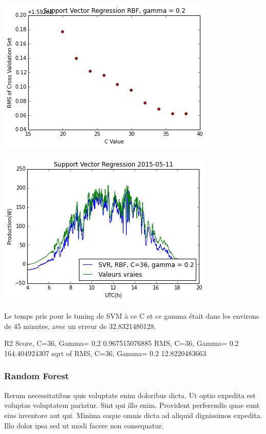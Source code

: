 \documentclass[a4paper]{article}
\begin{document}
\begin{multicols}{2}
\includegraphics[width=\textwidth/2]{./images/svmselectc.png}

\includegraphics[width=\textwidth/2]{./images/11maysvm.png}

Le temps pris pour le tuning de SVM à ce C et ce gamma était dans les environs de 45 minutes, avec un erreur de 32.8321480128. 

R2 Score, C=36, Gamma= 0.2
0.967515076885
RMS, C=36, Gamma= 0.2
164.404924307
sqrt of RMS, C=36, Gamma= 0.2
12.8220483663

\subsubsection{Random Forest}
Rerum necessitatibus quis voluptate enim doloribus dicta. Ut optio expedita est
    voluptas voluptatem pariatur. Sint qui illo enim. Provident perferendis quae
    sunt eius inventore aut qui. Minima eaque omnis dicta ad aliquid dignissimos
    expedita. Illo dolor ipsa sed ut modi facere non consequatur.


\end{multicols}
\end{document}
